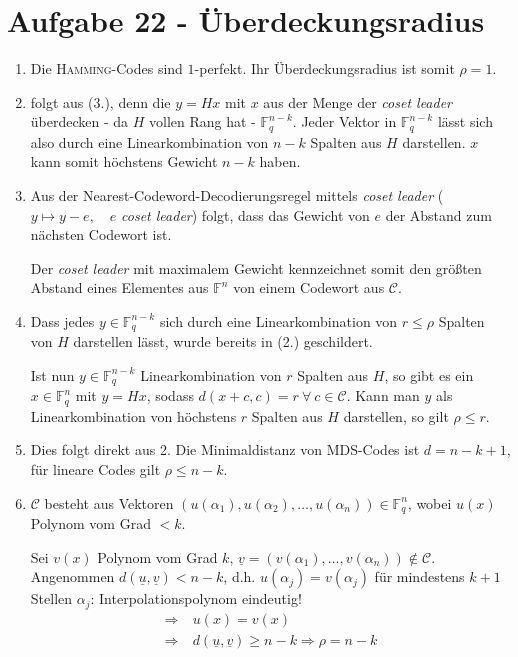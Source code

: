 \section*{Aufgabe 22 - Überdeckungsradius}
\begin{enumerate}
\item
	Die \textsc{Hamming}-Codes sind $1$-perfekt. Ihr Überdeckungsradius ist
	somit $\rho = 1$.
\item
	folgt aus (3.), denn die $y = H x$ mit $x$ aus der Menge der
	\textit{coset leader} überdecken - da $H$ vollen Rang hat -
	$\mathds{F}_q^{n-k}$. Jeder Vektor in $\mathds{F}_q^{n-k}$ lässt sich
	also durch eine Linearkombination von $n - k$ Spalten aus $H$
	darstellen. $x$ kann somit höchstens Gewicht $n - k$ haben.
\item
	Aus der Nearest-Codeword-Decodierungsregel mittels \textit{coset
	leader} ($y \mapsto y - e, \quad e$ \textit{coset leader}) folgt, dass
	das Gewicht von $e$ der Abstand zum nächsten Codewort ist.

	Der \textit{coset leader} mit maximalem Gewicht kennzeichnet somit den
	größten Abstand eines Elementes aus $\mathds{F}^n$ von einem Codewort
	aus $\mathcal{C}$.
\item
	Dass jedes $y \in \mathds{F}_q^{n-k}$ sich durch eine Linearkombination
	von $r \leq \rho$ Spalten von $H$ darstellen lässt, wurde bereits in (2.)
	geschildert.
	
	Ist nun $y \in \mathds{F}_q^{n-k}$ Linearkombination von $r$ Spalten
	aus $H$, so gibt es ein $x \in \mathds{F}_q^n$ mit $y = H x$, sodass
	$d(x + c, c) = r\ \forall\ c \in \mathcal{C}$.
	Kann man $y$ als Linearkombination von höchstens $r$ Spalten aus $H$
	darstellen, so gilt $\rho \leq r$.
\item
	Dies folgt direkt aus 2. Die Minimaldistanz von MDS-Codes ist $d = n -
	k + 1$, für lineare Codes gilt $\rho \leq n - k$.
\item
	$\mathcal{C}$ besteht aus Vektoren $\left(u(\alpha_1), u(\alpha_2),
	\dots, u(\alpha_n)\right) \in \mathds{F}_q^n$, wobei $u(x)$ Polynom vom
	Grad $< k$.

	Sei $v(x)$ Polynom vom Grad $k$, $\underline{v} = \left(v(\alpha_1),
	\dots, v(\alpha_n)\right) \not\in \mathcal{C}$. Angenommen $d(\underline{u},
	\underline{v}) < n - k$, d.h. $u(\alpha_j) = v(\alpha_j)$ für mindestens $k +
	1$ Stellen $\alpha_j$: Interpolationspolynom eindeutig!
	\begin{align*} \Rightarrow\ & u(x) = v(x) \\
		\Rightarrow\ & d(\underline{u}, \underline{v}) \geq n - k
		\Rightarrow \rho = n - k
	\end{align*}
\end{enumerate}
